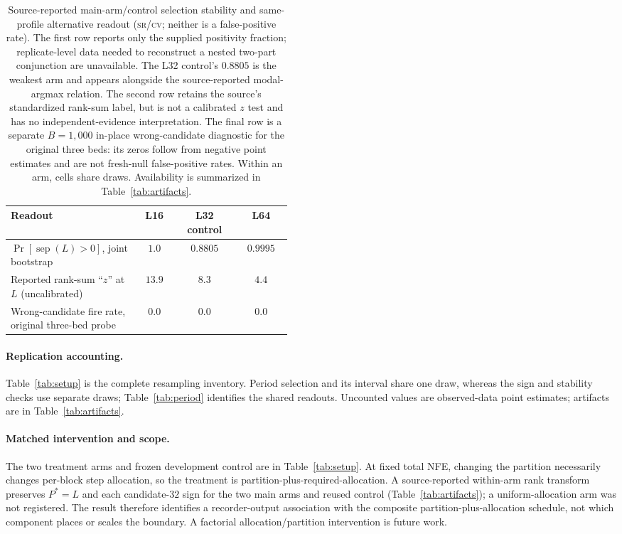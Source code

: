\documentclass{article}
\newcommand{\srcv}{\textsc{sr/cv}}
\begin{document}
\begin{table}[!b]
\centering
\footnotesize
\setlength{\tabcolsep}{2.7pt}
\begin{tabular}{@{}>{\raggedright\arraybackslash}p{0.46\linewidth}ccc@{}}
\toprule
Readout & L16 & \shortstack{L32\\control} & L64 \\
\midrule
$\Pr[\operatorname{sep}(L)>0]$, joint bootstrap & $1.0$ & $0.8805$ &
$0.9995$ \\
Reported rank-sum ``$z$'' at $L$ (uncalibrated) & $13.9$ & $8.3$ & $4.4$ \\
Wrong-candidate fire rate, original three-bed probe & $0.0$ & $0.0$ & $0.0$ \\
\bottomrule
\end{tabular}
\caption{Source-reported main-arm/control selection stability and same-profile
alternative readout (\srcv; neither is a false-positive rate). The first row reports only
the supplied positivity fraction; replicate-level data needed to reconstruct a
nested two-part conjunction are unavailable. The L32 control's $0.8805$ is the
weakest arm and appears alongside the source-reported modal-argmax relation. The
second row retains the source's standardized rank-sum label, but is not a
calibrated $z$ test and has no independent-evidence interpretation. The
final row is a separate $B{=}1{,}000$ in-place wrong-candidate diagnostic for
the original three beds: its zeros follow from negative point estimates and
are not fresh-null false-positive rates. Within an arm, cells share draws.
Availability is summarized in Table~\ref{tab:artifacts}.}
\label{tab:fpr}
\end{table}

\paragraph{Replication accounting.}
Table~\ref{tab:setup} is the complete resampling inventory. Period selection and
its interval share one draw, whereas the sign and stability checks use separate
draws; Table~\ref{tab:period} identifies the shared readouts. Uncounted values are
observed-data point estimates; artifacts are in Table~\ref{tab:artifacts}.

\paragraph{Matched intervention and scope.}
The two treatment arms and frozen development control are in
Table~\ref{tab:setup}. At fixed total NFE, changing the partition necessarily
changes per-block step allocation, so the treatment is
partition-plus-required-allocation. A source-reported within-arm rank transform
preserves $P^*{=}L$ and each candidate-$32$ sign for the two main arms and reused
control (Table~\ref{tab:artifacts}); a uniform-allocation arm was not registered. The
result therefore identifies a recorder-output association with the composite
partition-plus-allocation schedule, not which component places or scales the
boundary. A factorial allocation/partition intervention is future work.
\end{document}
